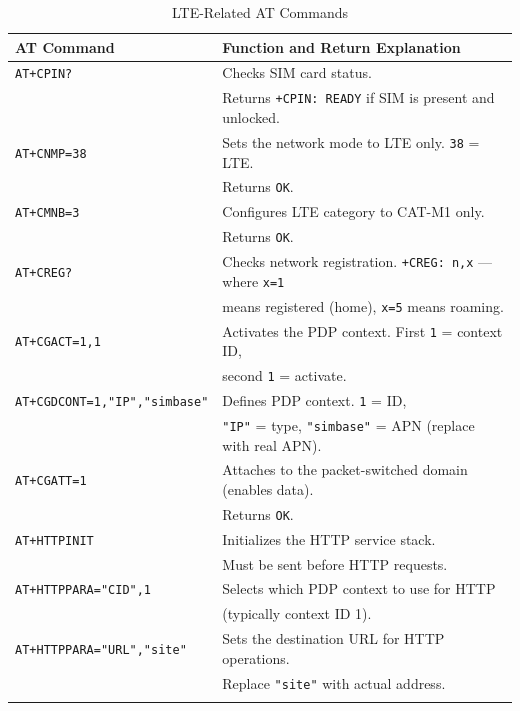 \begin{table}[H]
    \centering
    \small
    \begin{tabular}{l|l}
        \textbf{AT Command} & \textbf{Function and Return Explanation} \\
        \hline
        \arrayrulecolor[gray]{0.85}
        \texttt{AT+CPIN?} & Checks SIM card status. \\ 
        & Returns \texttt{+CPIN: READY} if SIM is present and unlocked. \\
        \hline
        \texttt{AT+CNMP=38} & Sets the network mode to LTE only. \texttt{38} = LTE. \\ 
        & Returns \texttt{OK}. \\
        \hline
        \texttt{AT+CMNB=3} & Configures LTE category to CAT-M1 only. \\ 
        & Returns \texttt{OK}. \\
        \hline
        \texttt{AT+CREG?} & Checks network registration. \texttt{+CREG: n,x} — where \texttt{x=1} \\ 
        & means registered (home), \texttt{x=5} means roaming. \\
        \hline
        \texttt{AT+CGACT=1,1} & Activates the PDP context. First \texttt{1} = context ID, \\ 
        & second \texttt{1} = activate. \\
        \hline
        \texttt{AT+CGDCONT=1,"IP","simbase"} & Defines PDP context. \texttt{1} = ID,\\ 
        & \texttt{"IP"} = type, \texttt{"simbase"} = APN (replace with real APN). \\
        \hline
        \texttt{AT+CGATT=1} & Attaches to the packet-switched domain (enables data). \\ 
        & Returns \texttt{OK}. \\
        \hline
        \texttt{AT+HTTPINIT} & Initializes the HTTP service stack.\\ 
        & Must be sent before HTTP requests. \\
        \hline
        \texttt{AT+HTTPPARA="CID",1} & Selects which PDP context to use for HTTP\\ 
        & (typically context ID 1). \\
        \hline
        \texttt{AT+HTTPPARA="URL","site"} & Sets the destination URL for HTTP operations. \\ 
        & Replace \texttt{"site"} with actual address. \\
        \arrayrulecolor{black}
    \end{tabular}
    \caption{LTE-Related AT Commands}
\end{table}
